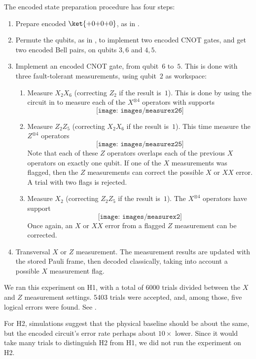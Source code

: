 \documentclass[10pt, twocolumn, aps, nofootinbib, longbibliography, nobibnotes, superscriptaddress]{revtex4-1} %
\begin{document}
The encoded state preparation procedure has four steps: 
\begin{enumerate}[leftmargin=*]
\item 
Prepare encoded $\ket{{+}0{+}0{+}0}$, as in .  
\item 
Permute the qubits, as in , to implement two encoded CNOT gates, and get two encoded Bell pairs, on qubits $3,6$ and $4,5$.  
\item 
Implement an encoded CNOT gate, from qubit~$6$ to~$5$.  This is done with three fault-tolerant measurements, using qubit~$2$ as workspace: 
\begin{enumerate}[leftmargin=*]
\item Measure $X_2 X_6$ (correcting $Z_2$ if the result is~$1$).  This is done by using the circuit in  to measure each of the $X^{\otimes 4}$ operators with supports 
$$
\texttt{[image: images/measurex26]}
$$
\item Measure $Z_2 Z_5$ (correcting $X_2 X_6$ if the result is~$1$).  This time measure the $Z^{\otimes 4}$ operators 
$$
\texttt{[image: images/measurez25]}
$$
Note that each of these $Z$ operators overlaps each of the previous $X$ operators on exactly one qubit.  If one of the $X$ measurements was flagged, then the $Z$ measurements can correct the possible $X$ or $XX$ error.  A trial with two flags is rejected.  
\item Measure $X_2$ (correcting $Z_2 Z_5$ if the result is~$1$).  The $X^{\otimes 4}$ operators have support 
$$
\texttt{[image: images/measurex2]}
$$
Once again, an $X$ or $XX$ error from a flagged $Z$ measurement can be corrected.  
\end{enumerate}
\item
Transversal $X$ or $Z$ measurement.  The measurement results are updated with the stored Pauli frame, then decoded classically, taking into account a possible $X$ measurement flag.  
\end{enumerate}

We ran this experiment on H1, with a total of 6000 trials divided between the $X$ and $Z$ measurement settings.  5403 trials were accepted, and, among those, five logical errors were found.  See .  

For H2, simulations suggest that the physical baseline should be about the same, but the encoded circuit's error rate perhaps about $10 \times$ lower.  Since it would take many trials to distinguish H2 from H1, we did not run the experiment on H2.  
\end{document}

